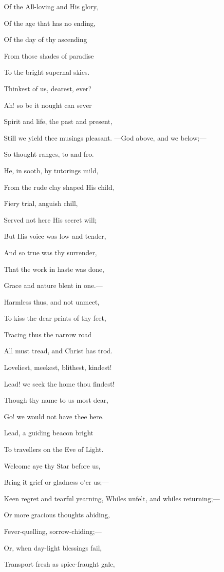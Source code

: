 Of the All-loving and His glory,

Of the age that has no ending,

Of the day of thy ascending

From those shades of paradise

To the bright supernal skies.

Thinkest of us, dearest, ever?

Ah! so be it nought can sever

Spirit and life, the past and present,

Still we yield thee musings pleasant. —God above, and we below;—

So thought ranges, to and fro.

He, in sooth, by tutorings mild,

From the rude clay shaped His child,

Fiery trial, anguish chill,

Served not here His secret will;

But His voice was low and tender,

And so true was thy surrender,

That the work in haste was done,

Grace and nature blent in one.—

Harmless thus, and not unmeet,

To kiss the dear prints of thy feet,

Tracing thus the narrow road

All must tread, and Christ has trod.

Loveliest, meekest, blithest, kindest!

Lead! we seek the home thou findest!

Though thy name to us most dear,

Go! we would not have thee here.

Lead, a guiding beacon bright

To travellers on the Eve of Light.

Welcome aye thy Star before us,

Bring it grief or gladness o'er us;—

Keen regret and tearful yearning, Whiles unfelt, and whiles returning;—

Or more gracious thoughts abiding,

Fever-quelling, sorrow-chiding;—

Or, when day-light blessings fail,

Transport fresh as spice-fraught gale,

